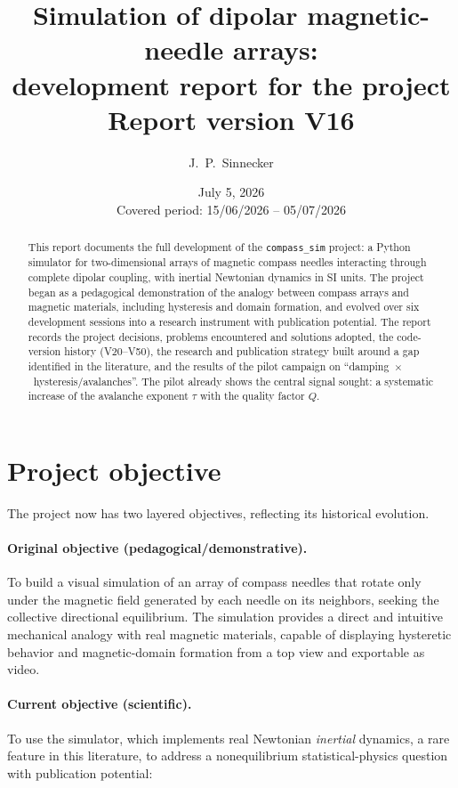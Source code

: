 \documentclass[11pt,a4paper]{article}
\title{\textbf{Simulation of dipolar magnetic-needle arrays:\\
development report for the \code{compass\_sim} project}\\[1ex]
\large Report version V16}
\author{J.~P.~Sinnecker}
\date{July 5, 2026\\[0.5ex]
\small Covered period: 15/06/2026 -- 05/07/2026}
\newcommand{\code}[1]{\texttt{#1}}
\begin{document}
\maketitle

\begin{abstract}
\noindent
This report documents the full development of the \code{compass\_sim} project: a Python simulator for two-dimensional arrays of magnetic compass needles interacting through complete dipolar coupling, with inertial Newtonian dynamics in SI units. The project began as a pedagogical demonstration of the analogy between compass arrays and magnetic materials, including hysteresis and domain formation, and evolved over six development sessions into a research instrument with publication potential. The report records the project decisions, problems encountered and solutions adopted, the code-version history (V20--V50), the research and publication strategy built around a gap identified in the literature, and the results of the pilot campaign on ``damping~$\times$~hysteresis/avalanches''. The pilot already shows the central signal sought: a systematic increase of the avalanche exponent $\tau$ with the quality factor $Q$.
\end{abstract}

\tableofcontents
\newpage

\section{Project objective}

The project now has two layered objectives, reflecting its historical evolution.

\paragraph{Original objective (pedagogical/demonstrative).}
To build a visual simulation of an array of compass needles that rotate only under the magnetic field generated by each needle on its neighbors, seeking the collective directional equilibrium. The simulation provides a direct and intuitive mechanical analogy with real magnetic materials, capable of displaying hysteretic behavior and magnetic-domain formation from a top view and exportable as video.

\paragraph{Current objective (scientific).}
To use the simulator, which implements real Newtonian \emph{inertial} dynamics, a rare feature in this literature, to address a nonequilibrium statistical-physics question with publication potential:
\end{document}
